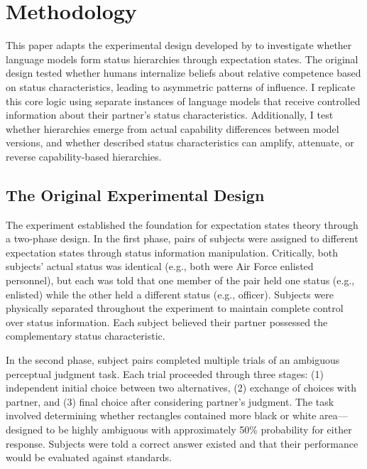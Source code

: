 
\section{Methodology}

This paper adapts the experimental design developed by \citet{Berger-1972-Status} to investigate whether language models form status hierarchies through expectation states. The original design tested whether humans internalize beliefs about relative competence based on status characteristics, leading to asymmetric patterns of influence. I replicate this core logic using separate instances of language models that receive controlled information about their partner's status characteristics. Additionally, I test whether hierarchies emerge from actual capability differences between model versions, and whether described status characteristics can amplify, attenuate, or reverse capability-based hierarchies.

\subsection{The Original Experimental Design}

The \citet{Berger-1972-Status} experiment established the foundation for expectation states theory through a two-phase design. In the first phase, pairs of subjects were assigned to different expectation states through status information manipulation. Critically, both subjects' actual status was identical (e.g., both were Air Force enlisted personnel), but each was told that one member of the pair held one status (e.g., enlisted) while the other held a different status (e.g., officer). Subjects were physically separated throughout the experiment to maintain complete control over status information. Each subject believed their partner possessed the complementary status characteristic.

In the second phase, subject pairs completed multiple trials of an ambiguous perceptual judgment task. Each trial proceeded through three stages: (1) independent initial choice between two alternatives, (2) exchange of choices with partner, and (3) final choice after considering partner's judgment. The task involved determining whether rectangles contained more black or white area—designed to be highly ambiguous with approximately 50\% probability for either response. Subjects were told a correct answer existed and that their performance would be evaluated against standards.

